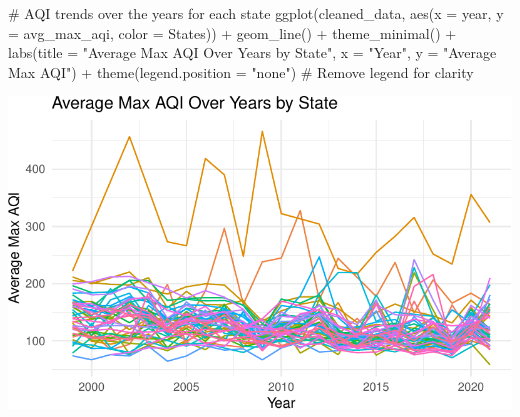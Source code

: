 \documentclass[
  12pt,
]{article}
\newenvironment{Shaded}{\begin{snugshade}}{\end{snugshade}}
\newcommand{\AttributeTok}[1]{\textcolor[rgb]{0.40,0.45,0.13}{#1}}
\newcommand{\CommentTok}[1]{\textcolor[rgb]{0.37,0.37,0.37}{#1}}
\newcommand{\FunctionTok}[1]{\textcolor[rgb]{0.28,0.35,0.67}{#1}}
\newcommand{\NormalTok}[1]{\textcolor[rgb]{0.00,0.23,0.31}{#1}}
\newcommand{\SpecialCharTok}[1]{\textcolor[rgb]{0.37,0.37,0.37}{#1}}
\newcommand{\StringTok}[1]{\textcolor[rgb]{0.13,0.47,0.30}{#1}}
\begin{document}
\begin{Shaded}
\begin{Highlighting}[]
\CommentTok{\# AQI trends over the years for each state}
\FunctionTok{ggplot}\NormalTok{(cleaned\_data, }\FunctionTok{aes}\NormalTok{(}\AttributeTok{x =}\NormalTok{ year, }\AttributeTok{y =}\NormalTok{ avg\_max\_aqi, }\AttributeTok{color =}\NormalTok{ States)) }\SpecialCharTok{+}
  \FunctionTok{geom\_line}\NormalTok{() }\SpecialCharTok{+}
  \FunctionTok{theme\_minimal}\NormalTok{() }\SpecialCharTok{+}
  \FunctionTok{labs}\NormalTok{(}\AttributeTok{title =} \StringTok{"Average Max AQI Over Years by State"}\NormalTok{, }
       \AttributeTok{x =} \StringTok{"Year"}\NormalTok{, }\AttributeTok{y =} \StringTok{"Average Max AQI"}\NormalTok{) }\SpecialCharTok{+}
  \FunctionTok{theme}\NormalTok{(}\AttributeTok{legend.position =} \StringTok{"none"}\NormalTok{) }\CommentTok{\# Remove legend for clarity}
\end{Highlighting}
\end{Shaded}

\includegraphics{final_main_quarto_presentation_files/figure-pdf/unnamed-chunk-4-1.pdf}
\end{document}
